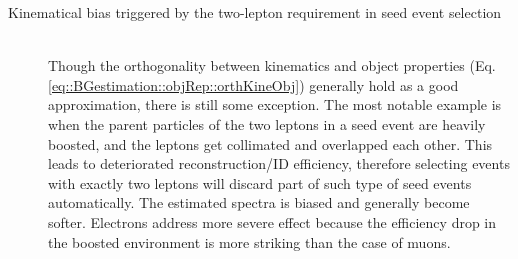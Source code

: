 \begin{description}
\item [Kinematical bias triggered by the two-lepton requirement in seed event selection] \mbox{} \\
Though the orthogonality between kinematics and object properties (Eq. \ref{eq::BGestimation::objRep::orthKineObj}) generally hold as a good approximation, there is still some exception. The most notable example is when the parent particles of the two leptons in a seed event are heavily boosted, and the leptons get collimated and overlapped each other. This leads to deteriorated reconstruction/ID efficiency, therefore selecting events with exactly two leptons will discard part of such type of seed events automatically. 
The estimated spectra is biased and generally become softer. Electrons address more severe effect because the efficiency drop in the boosted environment is more striking than the case of muons.



\end{description}
